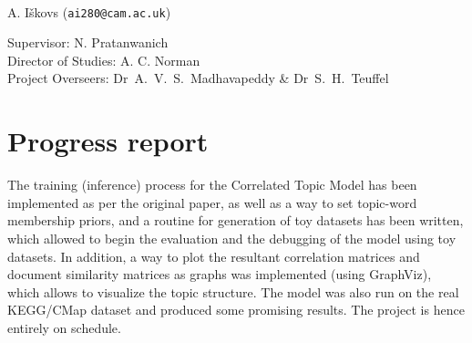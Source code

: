 \documentclass[12pt,a4]{article}
\begin{document}
\begin{center}

\textbf{}\\
A. I\v{s}kovs (\texttt{ai280@cam.ac.uk})\\
\vspace{0.3in}

Supervisor: N. Pratanwanich\\
Director of Studies: A. C. Norman\\
Project Overseers: Dr~A.~V.~S.~Madhavapeddy  \& Dr~S.~H.~Teuffel\\

\end{center}


\section*{Progress report}

The training (inference) process for the Correlated Topic Model has been implemented as per the original paper, as well as a way to set topic-word membership priors, and a routine for generation of toy datasets has been written, which allowed to begin the evaluation and the debugging of the model using toy datasets. In addition, a way to plot the resultant correlation matrices and document similarity matrices as graphs was implemented (using GraphViz), which allows to visualize the topic structure. The model was also run on the real KEGG/CMap dataset and produced some promising results. The project is hence entirely on schedule.
\end{document}
